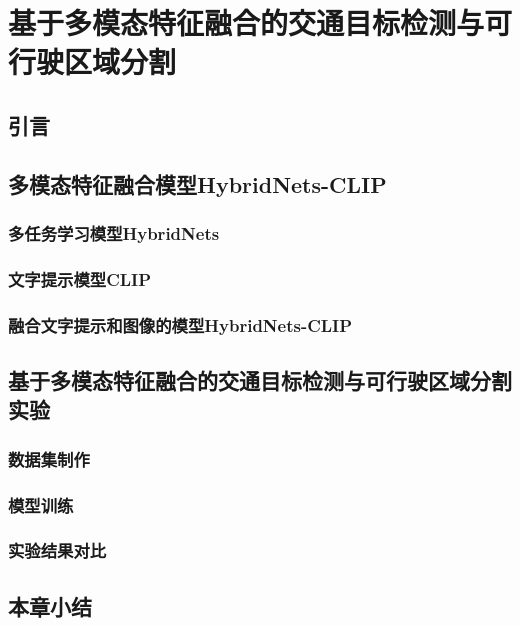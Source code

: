 
\chapter{基于多模态特征融合的交通目标检测与可行驶区域分割}

\section{引言}

\section{多模态特征融合模型HybridNets-CLIP}
\subsection{多任务学习模型HybridNets}
\subsection{文字提示模型CLIP}
\subsection{融合文字提示和图像的模型HybridNets-CLIP}

\section{基于多模态特征融合的交通目标检测与可行驶区域分割实验}
\subsection{数据集制作}
\subsection{模型训练}
\subsection{实验结果对比}

\section{本章小结}










